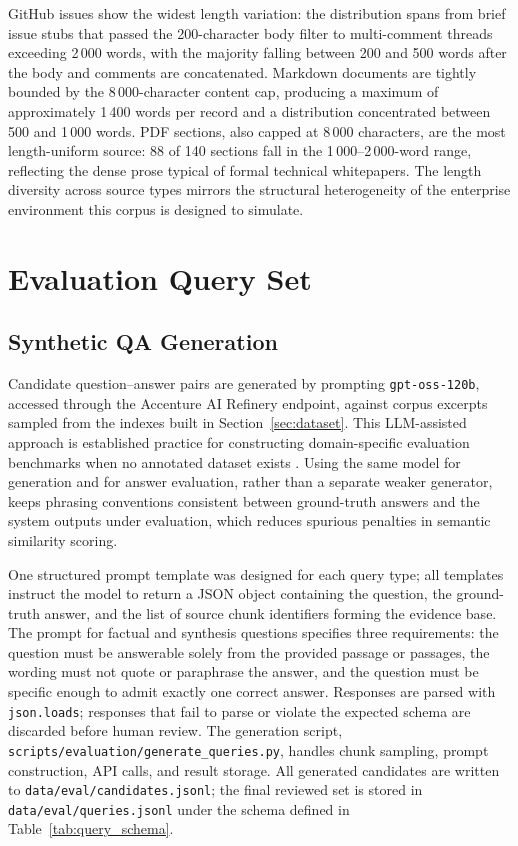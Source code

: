 GitHub issues show the widest length variation: the distribution spans from brief issue stubs that passed the 200-character body filter to multi-comment threads exceeding 2\,000 words, with the majority falling between 200 and 500 words after the body and comments are concatenated. Markdown documents are tightly bounded by the 8\,000-character content cap, producing a maximum of approximately 1\,400 words per record and a distribution concentrated between 500 and 1\,000 words. PDF sections, also capped at 8\,000 characters, are the most length-uniform source: 88 of 140 sections fall in the 1\,000--2\,000-word range, reflecting the dense prose typical of formal technical whitepapers. The length diversity across source types mirrors the structural heterogeneity of the enterprise environment this corpus is designed to simulate.

\section{Evaluation Query Set}

\subsection{Synthetic QA Generation}

Candidate question--answer pairs are generated by prompting \texttt{gpt-oss-120b}, accessed through the Accenture AI Refinery endpoint, against corpus excerpts sampled from the indexes built in Section~\ref{sec:dataset}. This LLM-assisted approach is established practice for constructing domain-specific evaluation benchmarks when no annotated dataset exists \cite{es2023ragas}. Using the same model for generation and for answer evaluation, rather than a separate weaker generator, keeps phrasing conventions consistent between ground-truth answers and the system outputs under evaluation, which reduces spurious penalties in semantic similarity scoring.

One structured prompt template was designed for each query type; all templates instruct the model to return a JSON object containing the question, the ground-truth answer, and the list of source chunk identifiers forming the evidence base. The prompt for factual and synthesis questions specifies three requirements: the question must be answerable solely from the provided passage or passages, the wording must not quote or paraphrase the answer, and the question must be specific enough to admit exactly one correct answer. Responses are parsed with \texttt{json.loads}; responses that fail to parse or violate the expected schema are discarded before human review. The generation script, \texttt{scripts/evaluation/generate\_queries.py}, handles chunk sampling, prompt construction, API calls, and result storage. All generated candidates are written to \texttt{data/eval/candidates.jsonl}; the final reviewed set is stored in \texttt{data/eval/queries.jsonl} under the schema defined in Table~\ref{tab:query_schema}.

